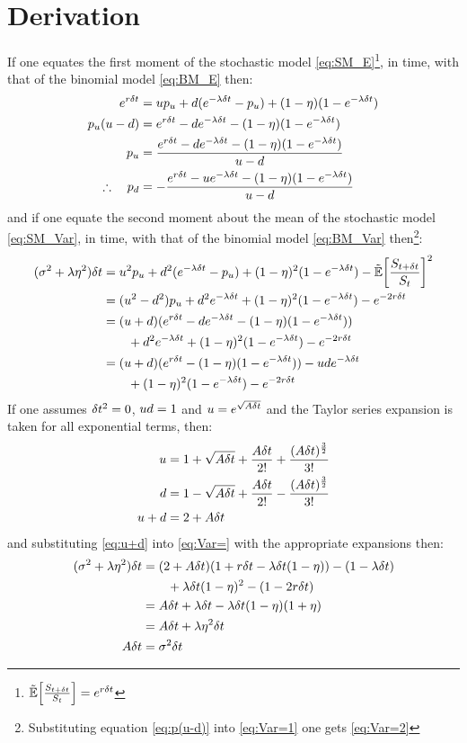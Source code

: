 \documentclass[a4paper,11pt,oneside]{report}
\theoremstyle{plain}
\theoremstyle{definition}
\begin{document}
\section{Derivation}
If one equates the first moment of the stochastic model \eqref{eq:SM_E}\footnote{$\E[\frac{S_{t + \Dt}}{\S}] = e^{r\Dt}$}, in \Dt time, with that of the binomial model \eqref{eq:BM_E} then:
\begin{align}
 e^{r\delta t}       &= up_u + d(e^{-\lambda\delta t} - p_u) + (1 - \eta)(1 - e^{-\lambda\delta t}) \nonumber\\
 p_u(u - d)   &= e^{r\delta t} - d e^{-\lambda\delta t} - (1 - \eta)(1 - e^{-\lambda\delta t}) \label{eq:p(u-d)}\\
 p_u            &= \frac{e^{r\delta t} - d e^{-\lambda\delta t} - (1 - \eta)(1 - e^{-\lambda\delta t})}{u - d} \\
 \therefore\quad p_d &= -\frac{e^{r\delta t} - u e^{-\lambda\delta t} - (1 - \eta)(1 - e^{-\lambda\delta t})}{u - d}
\end{align}
and if one equate the second moment about the mean of the stochastic model \eqref{eq:SM_Var}, in \Dt time, with that of the binomial model \eqref{eq:BM_Var} then\footnote{Substituting equation \eqref{eq:p(u-d)} into \eqref{eq:Var=1} one gets \eqref{eq:Var=2}}:
\begin{align}
 (\sigma^2 + \lambda\eta^2)\Dt &= \u^2\pu + \d^2(e^{-\lambda\Dt} - \pu) + (1 - \eta)^2(1 - e^{-\lambda\Dt}) - \E[\frac{S_{t + \Dt}}{\S}]^2 \n
                        &= (\u^2 - \d^2)\pu + \d^2 e^{-\lambda\Dt} +  (1 - \eta)^2(1 - e^{-\lambda\Dt}) - e^{-2r\Dt} \label{eq:Var=1} \\
                        &= (\u + \d)(e^{r\Dt} - \d e^{-\lambda\Dt} - (1 - \eta)(1 - e^{-\lambda\Dt})) \label{eq:Var=2} \\
                        &\qquad + \d^2 e^{-\lambda\Dt} + (1 - \eta)^2(1 - e^{-\lambda\Dt}) - e^{-2r\Dt} \n
                        &= (\u + \d)(e^{r\Dt} - (1 - \eta)(1 - e^{-\lambda\Dt})) - \u\d e^{-\lambda\Dt} \label{eq:Var=} \\
                        &\qquad + (1 - \eta)^2(1 - e^{-\lambda\Dt}) - e^{-2r\Dt} \nonumber
\end{align}
If one assumes $\delta t^2 = 0$, $ud = 1$ and $u = e^{\sqrt{A\delta t}}$ and the Taylor series expansion is taken for all exponential terms, then:
\begin{align}
 u                     &= 1 + \sqrt{A\delta t} + \frac{A\delta t}{2!} + \frac{(A\delta t)^{\frac{3}{2}}}{3!} \nonumber\\
 d                     &= 1 - \sqrt{A\delta t} + \frac{A\delta t}{2!} - \frac{(A\delta t)^{\frac{3}{2}}}{3!} \nonumber\\
 u + d                &= 2 + A\delta t \label{eq:u+d}
\end{align}
and substituting \eqref{eq:u+d} into \eqref{eq:Var=} with the appropriate expansions then:
\begin{align}
 (\sigma^2 + \lambda\eta^2)\delta t &= (2 + A\delta t)(1 + r\delta t - \lambda\delta t(1 - \eta)) - (1 - \lambda\delta t) \nonumber\\
                        &\qquad + \lambda\delta t(1 - \eta)^2 - (1 - 2r\delta t) \nonumber\\
                        &= A\delta t + \lambda\delta t - \lambda\delta t(1 - \eta)(1 + \eta) \nonumber\\
                        &= A\delta t + \lambda\eta^2\delta t \nonumber\\
 A\delta t                   &= \sigma^2\delta t
\end{align}
\end{document}
